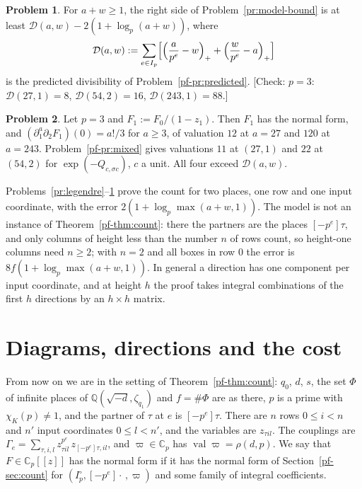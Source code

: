 \documentclass[reqno]{amsart}
\theoremstyle{plain}
\theoremstyle{definition}
\newtheorem{problem}{Problem}[section]
\theoremstyle{remark}
\newcommand{\Q}{\mathbb{Q}}
\newcommand{\C}{\mathbb{C}}
\newcommand{\val}{\operatorname{val}}
\newcommand{\Dc}{\mathcal{D}}
\begin{document}
\begin{problem}\label{pr:model-count}
For \(a + w \ge 1\), the right side of Problem~\ref{pr:model-bound} is at least \(\Dc(a, w) - 2(1 + \log_p(a + w))\), where
\[
  \Dc(a, w) := \sum_{e \in I_p} \Bigl[\Bigl(\frac{a}{p^e} - w\Bigr)_+ + \Bigl(\frac{w}{p^e} - a\Bigr)_+\Bigr]
\]
is the predicted divisibility of Problem~\ref{pf-pr:predicted}.  [Check: \(p = 3\): \(\Dc(27, 1) = 8\), \(\Dc(54, 2) = 16\), \(\Dc(243, 1) = 88\).]
\end{problem}

\begin{problem}\label{pr:examples}
Let \(p = 3\) and \(F_1 := F_0/(1 - z_1)\).  Then \(F_1\) has the normal form, and \((\partial_1^a \partial_2 F_1)(0) = a!/3\) for \(a \ge 3\), of valuation \(12\) at \(a = 27\) and \(120\) at \(a = 243\).  Problem~\ref{pf-pr:mixed} gives valuations \(11\) at \((27, 1)\) and \(22\) at \((54, 2)\) for \(\exp(-Q_{c, \sigma c})\), \(c\) a unit.  All four exceed \(\Dc(a, w)\).
\end{problem}

Problems~\ref{pr:legendre}--\ref{pr:model-count} prove the count for two places, one row and one input coordinate, with the error \(2(1 + \log_p\max(a+w, 1))\).  The model is not an instance of Theorem~\ref{pf-thm:count}: there the partners are the places \([-p^e]\tau\), and only columns of height less than the number \(n\) of rows count, so height-one columns need \(n \ge 2\); with \(n = 2\) and all boxes in row \(0\) the error is \(8f(1 + \log_p\max(a+w, 1))\).  In general a direction has one component per input coordinate, and at height \(h\) the proof takes integral combinations of the first \(h\) directions by an \(h \times h\) matrix.

\section{Diagrams, directions and the cost}\label{sec:directions}

From now on we are in the setting of Theorem~\ref{pf-thm:count}: \(q_0\), \(d\), \(s\), the set \(\Phi\) of infinite places of \(\Q(\sqrt{-d}, \zeta_{q_1})\) and \(f = \#\Phi\) are as there, \(p\) is a prime with \(\chi_K(p) \ne 1\), and the partner of \(\tau\) at \(e\) is \([-p^e]\tau\).  There are \(n\) rows \(0 \le i < n\) and \(n'\) input coordinates \(0 \le l < n'\), and the variables are \(z_{\tau i l}\).  The couplings are \(\Gamma_e = \sum_{\tau, i, l} z_{\tau i l}^{p^e}\, z_{[-p^e]\tau, i l}\), and \(\varpi \in \C_p\) has \(\val \varpi = \rho(d,p)\).  We say that \(F \in \C_p[[z]]\) has the normal form if it has the normal form of Section~\ref{pf-sec:count} for \((I_p^\circ, [-p^e]\cdot\,, \varpi)\) and some family of integral coefficients.
\end{document}
